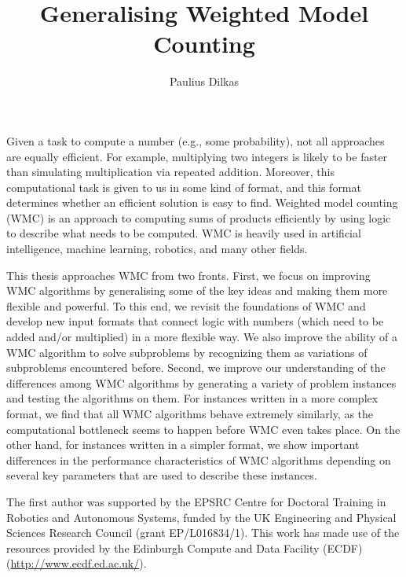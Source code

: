 \documentclass[phd,aiai,twoside,fullspacing,logo]{infthesis}
\title{Generalising Weighted Model Counting}
\author{Paulius Dilkas}
\theoremstyle{definition}
\theoremstyle{remark}
\numberwithin{assumption}{chapter}
\numberwithin{conjecture}{chapter}
\numberwithin{constraint}{chapter}
\numberwithin{fact}{chapter}
\numberwithin{proposition}{chapter}
\numberwithin{theorem}{chapter}
\numberwithin{lemma}{chapter}
\numberwithin{definition}{chapter}
\numberwithin{example}{chapter}
\numberwithin{experiment}{chapter}
\begin{document}
\nobibliography*

\begin{preliminary}

\maketitle

\begin{laysummary}
  Given a task to compute a number (e.g., some probability), not all approaches
  are equally efficient. For example, multiplying two integers is likely to be
  faster than simulating multiplication via repeated addition. Moreover, this
  computational task is given to us in some kind of format, and this format
  determines whether an efficient solution is easy to find. Weighted model
  counting (WMC) is an approach to computing sums of products efficiently by
  using logic to describe what needs to be computed. WMC is heavily used in
  artificial intelligence, machine learning, robotics, and many other fields.

  This thesis approaches WMC from two fronts. First, we focus on improving WMC
  algorithms by generalising some of the key ideas and making them more flexible
  and powerful. To this end, we revisit the foundations of WMC and develop new
  input formats that connect logic with numbers (which need to be added and/or
  multiplied) in a more flexible way. We also improve the ability of a WMC
  algorithm to solve subproblems by recognizing them as variations of
  subproblems encountered before. Second, we improve our understanding of the
  differences among WMC algorithms by generating a variety of problem instances
  and testing the algorithms on them. For instances written in a more complex
  format, we find that all WMC algorithms behave extremely similarly, as the
  computational bottleneck seems to happen before WMC even takes place. On the
  other hand, for instances written in a simpler format, we show important
  differences in the performance characteristics of WMC algorithms depending on
  several key parameters that are used to describe these instances.
\end{laysummary}

\begin{acknowledgements}
  The first author was supported by the EPSRC Centre for Doctoral Training in
  Robotics and Autonomous Systems, funded by the UK Engineering and Physical
  Sciences Research Council (grant EP/L016834/1). This work has made use of the
  resources provided by the Edinburgh Compute and Data Facility (ECDF)
  (\url{http://www.ecdf.ed.ac.uk/}).


\end{acknowledgements}
\end{preliminary}
\end{document}
